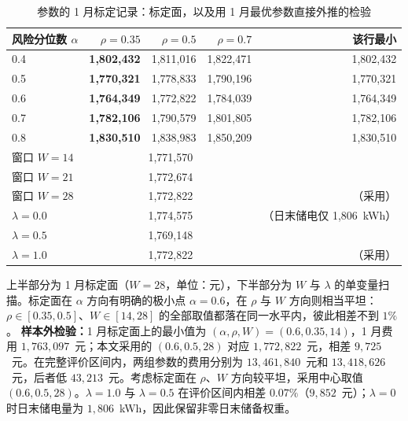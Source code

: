 \begin{table}[htbp]
  \centering
  \caption{参数的 1 月标定记录：标定面，以及用 1 月最优参数直接外推的检验}
  \label{tab:p3-calib}
  \small
  \begin{tabular}{lrrrr}
    \toprule
    风险分位数 $\alpha$ & $\rho=0.35$ & $\rho=0.5$ & $\rho=0.7$ & 该行最小 \\
    \midrule
    0.4 & \textbf{1,802,432} & 1,811,016 & 1,822,471 & 1,802,432 \\
    0.5 & \textbf{1,770,321} & 1,778,833 & 1,790,196 & 1,770,321 \\
    0.6 & \textbf{1,764,349} & 1,772,822 & 1,784,039 & 1,764,349 \\
    0.7 & \textbf{1,782,106} & 1,790,579 & 1,801,805 & 1,782,106 \\
    0.8 & \textbf{1,830,510} & 1,838,983 & 1,850,209 & 1,830,510 \\
    \midrule
    窗口 $W=14$ & \multicolumn{3}{c}{1,771,570} &  \\
    窗口 $W=21$ & \multicolumn{3}{c}{1,772,674} &  \\
    窗口 $W=28$ & \multicolumn{3}{c}{1,772,822} & （采用） \\
    \midrule
    $\lambda=0.0$ & \multicolumn{3}{c}{1,774,575} & （日末储电仅 1,806~kWh） \\
    $\lambda=0.5$ & \multicolumn{3}{c}{1,769,148} &  \\
    $\lambda=1.0$ & \multicolumn{3}{c}{1,772,822} & （采用） \\
    \bottomrule
  \end{tabular}
  \par\vspace{2pt}
  \begin{minipage}{\textwidth}\footnotesize
    上半部分为 1 月标定面（$W=28$，单位：元），下半部分为 $W$ 与 $\lambda$ 的单变量扫描。标定面在 $\alpha$ 方向有明确的极小点 $\alpha=0.6$，在 $\rho$ 与 $W$ 方向则相当平坦：$\rho\in[0.35,0.5]$、$W\in[14,28]$ 的全部取值都落在同一水平内，彼此相差不到 $1\%$。
    \textbf{样本外检验：}1 月标定面上的最小值为 $(\alpha,\rho,W)=(0.6,0.35,14)$，1 月费用 $1,763,097$~元；本文采用的 $(0.6,0.5,28)$ 对应 $1,772,822$~元，相差 $9,725$~元。在完整评价区间内，两组参数的费用分别为 $13,461,840$~元和 $13,418,626$~元，后者低 $43,213$~元。考虑标定面在 $\rho$、$W$ 方向较平坦，采用中心取值 $(0.6,0.5,28)$。$\lambda=1.0$ 与 $\lambda=0.5$ 在评价区间内相差 $0.07\%$（$9{,}852$~元）；$\lambda=0$ 时日末储电量为 $1{,}806$~kWh，因此保留非零日末储备权重。
  \end{minipage}
\end{table}

